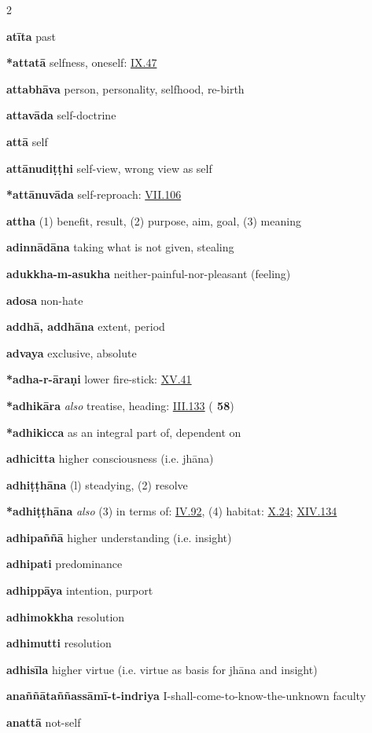 \begin{multicols}{2}
\begin{vismHanging}
\par\textbf{atīta} past
\par\textbf{*attatā} selfness, oneself: \hyperlink{IX.47}{IX.47}{} 
\par\textbf{attabhāva} person, personality, selfhood, re-birth 
\par\textbf{attavāda} self-doctrine
\par\textbf{attā} self
\par\textbf{attānudiṭṭhi} self-view, wrong view as self 
\par\textbf{*attānuvāda} self-reproach: \hyperlink{VII.106}{VII.106}{}
\par\textbf{attha} (1) benefit, result, (2) purpose, aim, goal, (3) meaning 
\par\textbf{adinnādāna} taking what is not given, stealing 
\par\textbf{adukkha-m-asukha} neither-painful-nor-pleasant (feeling) 
\par\textbf{adosa} non-hate
\par\textbf{addhā, addhāna} extent, period
\par\textbf{advaya} exclusive, absolute
\par\textbf{*adha-r-āraṇi} lower fire-stick: \hyperlink{XV.41}{XV.41}{}
\par\textbf{*adhikāra} \emph{also }treatise, heading: \hyperlink{III.133}{III.133}{} (\textbf{\cite{Dhs-a} 58}) 
\par\textbf{*adhikicca} as an integral part of, dependent on 
\par\textbf{adhicitta} higher consciousness (i.e. jhāna) 
\par\textbf{adhiṭṭhāna} (l) steadying, (2) resolve
\par\textbf{*adhiṭṭhāna} \emph{also }(3) in terms of: \hyperlink{IV.92}{IV.92}{}, (4) habitat: \hyperlink{X.24}{X.24}{}; \hyperlink{XIV.134}{XIV.134}{} 
\par\textbf{adhipaññā} higher understanding (i.e. insight) 
\par\textbf{adhipati} predominance
\par\textbf{adhippāya} intention, purport 
\par\textbf{adhimokkha} resolution 
\par\textbf{adhimutti} resolution
\par\textbf{adhisīla} higher virtue (i.e. virtue as basis for jhāna and insight) 
\par\textbf{anaññātaññassāmī-t-indriya} I-shall-come-to-know-the-unknown faculty 
\par\textbf{anattā} not-self 

\end{vismHanging}
\end{multicols}
